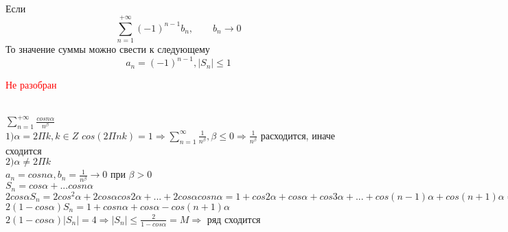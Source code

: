 \begin{Note}~\\
	Если
    \[
        \sum_{n=1}^{+\infty}(-1)^{n-1}b_n, \qquad b_n \rightarrow 0
    \]
    То значение суммы можно свести к следующему
	\[
        a_n = (-1)^{n-1}, |S_n| \leqslant 1    
    \]
\end{Note}

\textcolor{red}{Не разобран}
\begin{Example}~\\
	$\sum^{+\infty}_{n=1} \frac{cos n\alpha}{n^{\beta}}$\\
	$1) \alpha = 2\Pi k, k \in Z$ $cos(2 \Pi nk) = 1 \Rightarrow \sum^{\infty}_{n=1} \frac{1}{n^{\beta}}, \beta \leq 0 \Rightarrow \frac{1}{n^{\beta}}$ расходится, иначе сходится\\
	$2) \alpha \neq 2 \Pi k$\\
	$a_n = cos n\alpha, b_n = \frac{1}{n^{\beta}} \rightarrow 0$ при $\beta > 0$\\
	$S_n = cos \alpha + ... cos n\alpha$\\
	$2cos\alpha S_n = 2cos^2\alpha + 2cos\alpha cos2\alpha + ... + 2cos\alpha cosn\alpha = 1 + cos2\alpha + cos\alpha + cos3\alpha + ... + cos(n-1)\alpha + cos(n+1)\alpha = 1 + S_n - cosn\alpha + S_n - cos \alpha + cos(n+1)\alpha$\\
	$2(1-cos\alpha)S_n = 1 + cos n\alpha + cos\alpha - cos(n+1)\alpha$\\
	$2(1-cos\alpha)|S_n| = 4 \Rightarrow |S_n| \leq \frac{2}{1-cos\alpha} = M \Rightarrow$ ряд сходится\\
\end{Example}

